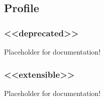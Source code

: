 \subsection{Profile} \label{model:Profile}
\subsubsection{<<deprecated>>}
  \label{type:deprecated}

\FloatBarrier

Placeholder for documentation!

\FloatBarrier
\subsubsection{<<extensible>>}
  \label{type:extensible}

\FloatBarrier

Placeholder for documentation!

\FloatBarrier
